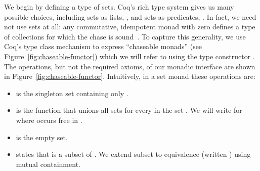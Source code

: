 \documentclass{sigplanconf}
\newcommand{\greg}[1]{\textcolor{blue}{GREG: #1}}
\begin{document}

We begin by defining a type of sets.
 Coq's rich type system gives us many possible choices, including sets as lists, , and sets as predicates, .
In fact, we need not use sets at all: any commutative, idempotent monad with zero defines a type of collections for which the chase is sound~\cite{Popa99anequational}.
To capture this generality, we use Coq's type class mechanism to express ``chaseable monads'' (see Figure~\ref{fig:chaseable-functor}) which we will refer to using the type constructor .
The operations, but not the required axioms, of our monadic interface are shown in Figure~\ref{fig:chaseable-functor}.
Intuitively, in a set monad these operations are:
\begin{itemize}
\item {} is the singleton set containing only .
\item {} is the function that unions all sets  for every  in the set .  We will write  for  where  occurs free in .
\item {} is the empty set.
\item {} states that  is a subset of . We extend subset to equivalence (written ) using mutual containment.
\end{itemize}
\end{document}
